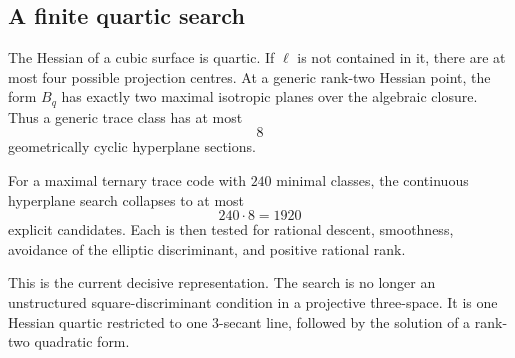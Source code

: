 \subsection{A finite quartic search}

The Hessian of a cubic surface is quartic.  If $\ell$ is not contained in it,
there are at most four possible projection centres.  At a generic rank-two
Hessian point, the form $B_q$ has exactly two maximal isotropic planes over the
algebraic closure.  Thus a generic trace class has at most
\[
\boxed{8}
\]
geometrically cyclic hyperplane sections.

For a maximal ternary trace code with $240$ minimal classes, the continuous
hyperplane search collapses to at most
\[
\boxed{240\cdot8=1920}
\]
explicit candidates.  Each is then tested for rational descent, smoothness,
avoidance of the elliptic discriminant, and positive rational rank.

This is the current decisive representation.  The search is no longer an
unstructured square-discriminant condition in a projective three-space.  It is
one Hessian quartic restricted to one 3-secant line, followed by the solution
of a rank-two quadratic form.
